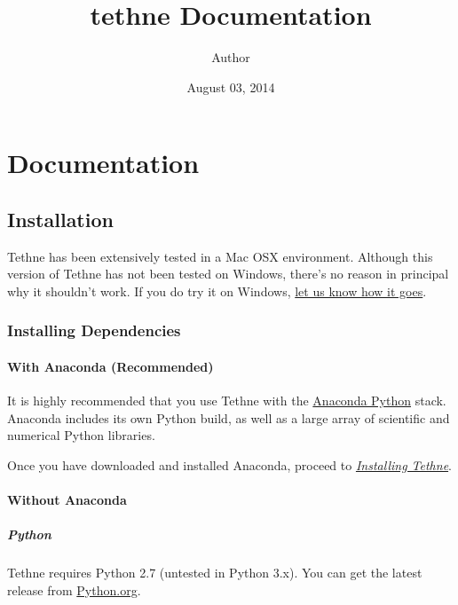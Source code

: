 \documentclass[letterpaper,10pt,english]{sphinxmanual}
\title{tethne Documentation}
\date{August 03, 2014}
\author{Author}
\begin{document}
\maketitle
\tableofcontents
{}\label{index::doc}



\chapter{Documentation}
\label{index:tethne-documentation-v0-6-0-beta}\label{index:documentation}

\section{Installation}
\label{installation:installation}\label{installation::doc}
Tethne has been extensively tested in a Mac OSX environment. Although this version of
Tethne has not been tested on Windows, there's no reason in principal
why it shouldn't work. If you do try it on Windows, \href{https://github.com/diging/tethne/issues?labels=installation\&state=open}{let us know how it goes}.


\subsection{Installing Dependencies}
\label{installation:installing-dependencies}

\subsubsection{With Anaconda (Recommended)}
\label{installation:with-anaconda-recommended}
It is highly recommended that you use Tethne with the \href{https://store.continuum.io/cshop/anaconda/}{Anaconda Python} stack. Anaconda includes its own Python
build, as well as a large array of scientific and numerical Python libraries.

Once you have downloaded and installed Anaconda, proceed to {\hyperref[installation:install-tethne]{\emph{Installing Tethne}}}.


\subsubsection{Without Anaconda}
\label{installation:without-anaconda}

\paragraph{Python}
\label{installation:python}
Tethne requires Python 2.7 (untested in Python 3.x). You can get the latest release from
\href{http://www.python.org}{Python.org}.
\end{document}
